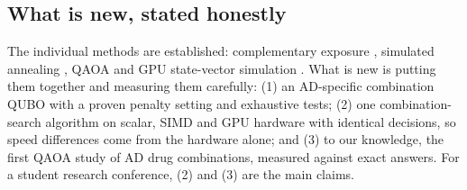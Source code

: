 \subsection{What is new, stated honestly}

The individual methods are established: complementary exposure \cite{cheng2019combinations}, simulated annealing \cite{kirkpatrick1983optimization}, QAOA \cite{farhi2014qaoa} and GPU state-vector simulation \cite{bayraktar2023cuquantum}. What is new is putting them together and measuring them carefully: (1) an AD-specific combination QUBO with a proven penalty setting and exhaustive tests; (2) one combination-search algorithm on scalar, SIMD and GPU hardware with identical decisions, so speed differences come from the hardware alone; and (3) to our knowledge, the first QAOA study of AD drug combinations, measured against exact answers. For a student research conference, (2) and (3) are the main claims.
